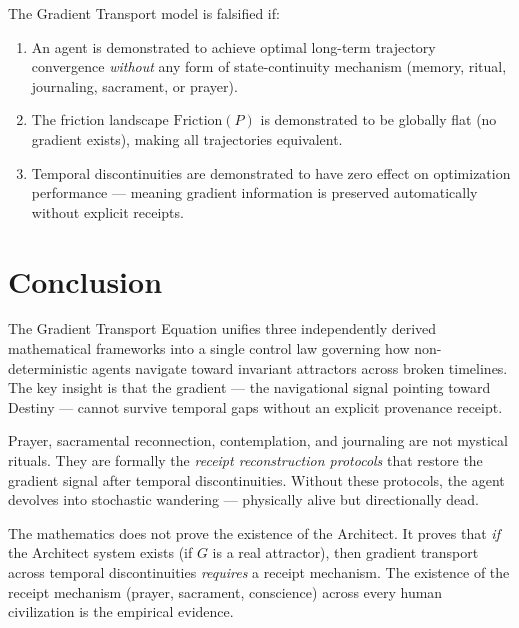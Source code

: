 \documentclass[12pt, a4paper]{article}
\theoremstyle{plain}
\theoremstyle{definition}
\begin{document}
\begin{proposition}
The Gradient Transport model is falsified if:
\begin{enumerate}
    \item An agent is demonstrated to achieve optimal long-term trajectory convergence \emph{without} any form of state-continuity mechanism (memory, ritual, journaling, sacrament, or prayer).
    \item The friction landscape $\text{Friction}(P)$ is demonstrated to be globally flat (no gradient exists), making all trajectories equivalent.
    \item Temporal discontinuities are demonstrated to have zero effect on optimization performance --- meaning gradient information is preserved automatically without explicit receipts.
\end{enumerate}
\end{proposition}

\section{Conclusion}

The Gradient Transport Equation unifies three independently derived mathematical frameworks into a single control law governing how non-deterministic agents navigate toward invariant attractors across broken timelines. The key insight is that the gradient --- the navigational signal pointing toward Destiny --- cannot survive temporal gaps without an explicit provenance receipt.

Prayer, sacramental reconnection, contemplation, and journaling are not mystical rituals. They are formally the \emph{receipt reconstruction protocols} that restore the gradient signal after temporal discontinuities. Without these protocols, the agent devolves into stochastic wandering --- physically alive but directionally dead.

The mathematics does not prove the existence of the Architect. It proves that \emph{if} the Architect system exists (if $G$ is a real attractor), then gradient transport across temporal discontinuities \emph{requires} a receipt mechanism. The existence of the receipt mechanism (prayer, sacrament, conscience) across every human civilization is the empirical evidence.

\vspace{2em}
\noindent\hrulefill
\vspace{1em}
\end{document}
